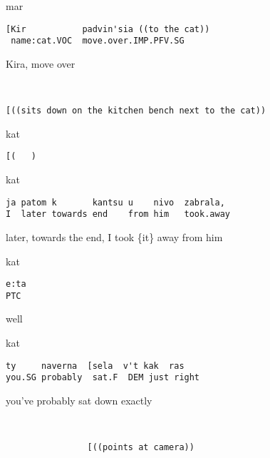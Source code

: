\documentclass[output=paper,modfonts,nonflat]{langsci/langscibook}
\begin{document}
\vspace{2mm}
%
\begin{transbox}{1}{mar}
\begin{verbatim}
[Kir           padvin'sia ((to the cat))
 name:cat.VOC  move.over.IMP.PFV.SG
\end{verbatim}
\hspace{0.07cm} Kira, move over
\end{transbox}
%
\begin{transbox}{2}{~}
\begin{verbatim}
[((sits down on the kitchen bench next to the cat))
\end{verbatim}
\end{transbox}
%
\begin{transbox}{3}{kat}
\begin{verbatim}
[(   )
\end{verbatim}
\end{transbox}
%
%
\begin{transbox}{5}{kat}
\begin{verbatim}
ja patom k       kantsu u    nivo  zabrala,
I  later towards end    from him   took.away
\end{verbatim}
later, towards the end, I took \{it\} away from him
\end{transbox}
%
%
\begin{mdframednoverticalspace}[style=firstfoc]
\begin{transbox}{7}{kat}
\begin{verbatim}
e:ta
PTC
\end{verbatim}
well
\end{transbox}
\end{mdframednoverticalspace}
%
%
\begin{mdframednoverticalspace}[style=firstfoc]
\begin{transbox}{9}{kat}
\begin{verbatim}
ty     naverna  [sela  v't kak  ras
you.SG probably  sat.F  DEM just right
\end{verbatim}
you’ve probably sat down exactly
\end{transbox}
\end{mdframednoverticalspace}
%
\begin{transbox}{10}{~}
\begin{verbatim}
                [((points at camera))
\end{verbatim}
\end{transbox}
\end{document}
